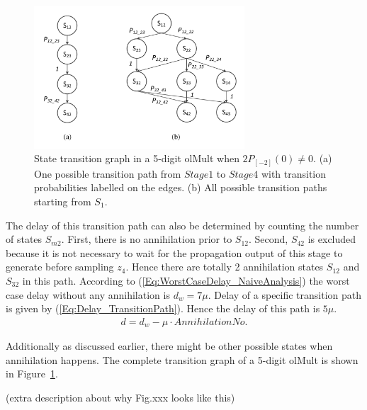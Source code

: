 \documentclass[a4paper, 11pt]{article}
\begin{document}
\begin{figure}[tbp]\label{Fig:StateTransGraph}
  \centering
  \includegraphics[width=0.7\textwidth]{./Figures/OlMult_TimingGraph.pdf}
  \caption{State transition graph in a 5-digit olMult when $2P_{[-2]}(0)\neq0$. (a) One possible transition path from $Stage1$ to $Stage4$ with transition probabilities labelled on the edges. (b) All possible transition paths starting from $S_1$.}
\end{figure}

The delay of this transition path can also be determined by counting the number of states $S_{m2}$. First, there is no annihilation prior to $S_{12}$. Second, $S_{42}$ is excluded because it is not necessary to wait for the propagation output of this stage to generate before sampling $z_4$. Hence there are totally 2 annihilation states $S_{12}$ and $S_{32}$ in this path. According to (\ref{Eq:WorstCaseDelay_NaiveAnalysis}) the worst case delay without any annihilation is $d_w=7\mu$. Delay of a specific transition path is given by (\ref{Eq:Delay_TransitionPath}). Hence the delay of this path is $5\mu$.
%
\begin{eqnarray}\label{Eq:Delay_TransitionPath}
  d = d_w - \mu\cdot AnnihilationNo.  
\end{eqnarray}

Additionally as discussed earlier, there might be other possible states when annihilation happens. The complete transition graph of a 5-digit olMult is shown in Figure~\ref{Fig:StateTransGraph}.

(extra description about why Fig.xxx looks like this)
\end{document}
